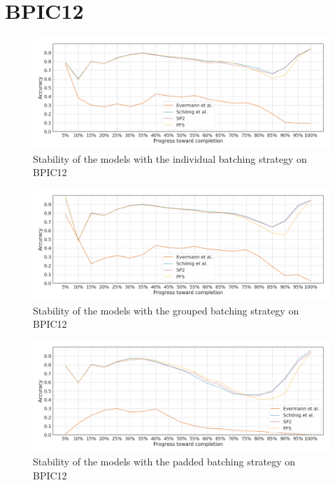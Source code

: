 \section*{BPIC12}
\begin{figure}[!htb]
    \centering
    \includegraphics[width=\textwidth]{gfx/bpic2012/individual_stability.png}
    \caption{Stability of the models with the individual batching strategy on BPIC12}
    \label{fig:bpic12-individual-stability}
\end{figure}
\begin{figure}[!htb]
    \centering
    \includegraphics[width=\textwidth]{gfx/bpic2012/grouped_stability.png}
    \caption{Stability of the models with the grouped batching strategy on BPIC12}
    \label{fig:bpic12-grouped-stability}
\end{figure}
\begin{figure}[!htb]
    \centering
    \includegraphics[width=\textwidth]{gfx/bpic2012/padded_stability.png}
    \caption{Stability of the models with the padded batching strategy on BPIC12}
    \label{fig:bpic12-padded-stability}
\end{figure}
